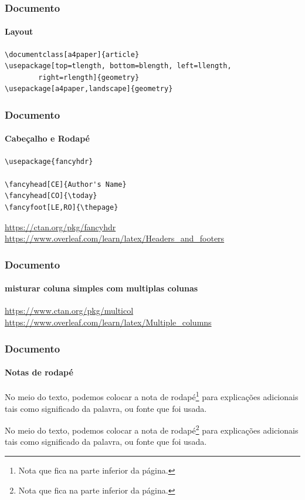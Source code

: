 \begin{frame}[fragile]
\frametitle{Documento}
\framesubtitle{Layout}
  \begin{verbatim}
\documentclass[a4paper]{article}
\usepackage[top=tlength, bottom=blength, left=llength,
        right=rlength]{geometry}
\usepackage[a4paper,landscape]{geometry}
  \end{verbatim} 
\end{frame}


\begin{frame}[fragile]
\frametitle{Documento}
\framesubtitle{Cabeçalho e Rodapé}
  \begin{verbatim}
\usepackage{fancyhdr}

\fancyhead[CE]{Author's Name}
\fancyhead[CO]{\today}
\fancyfoot[LE,RO]{\thepage}
  \end{verbatim} 
  
  \url{https://ctan.org/pkg/fancyhdr} \\
  \url{https://www.overleaf.com/learn/latex/Headers_and_footers}
\end{frame}


\begin{frame}[fragile]
\frametitle{Documento}
\framesubtitle{misturar coluna simples com multiplas colunas}

\small
\begin{LTXexample}
\lipsum[1][1-2]
\begin{multicols}{2}
\lipsum[1][3-6]
\end{multicols}
\lipsum[1][7-9]
\end{LTXexample}

\url{https://www.ctan.org/pkg/multicol} \\
\url{https://www.overleaf.com/learn/latex/Multiple_columns}
\end{frame}


\begin{frame}[fragile]
\frametitle{Documento}
\framesubtitle{Notas de rodapé}
\begin{LTXexample}
No meio do texto, podemos colocar a nota de rodapé\footnote{Nota que fica na
parte inferior da página.} para explicações adicionais tais como significado da
palavra, ou fonte que foi usada.
\end{LTXexample}
No meio do texto, podemos colocar a nota de rodapé\footnote{Nota que fica na
parte inferior da página.} para explicações adicionais tais como significado da
palavra, ou fonte que foi usada.
\end{frame}

